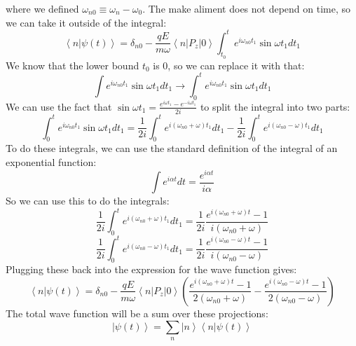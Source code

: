 \documentclass[12pt]{article}
\begin{document}
where we defined $\omega _{n0} \equiv \omega _n - \omega _0$. The make aliment does not depend on time, so we can take it outside of the integral:
\begin{equation}
\left\langle n|\psi(t)\right\rangle = \delta _{n0} - \frac{q E}{m \omega} \left\langle n\left|P_{z}\right|0\right\rangle \int_{t_0}^t e^{i \omega _{n0} t_1} \sin \omega t_1 d t_1
\end{equation}
We know that the lower bound $t_0$ is 0, so we can replace it with that:
\begin{equation}
\int e^{i \omega _{n0} t_1} \sin \omega t_1 d t_1 \rightarrow \int_0^t e^{i \omega _{n0} t_1} \sin \omega t_1 d t_1
\end{equation}
We can use the fact that $\sin \omega t_1 = \frac{e^{i \omega t_1} - e^{-i \omega t_1}}{2i}$ to split the integral into two parts:
\begin{equation}
\int_0^t e^{i \omega _{n0} t_1} \sin \omega t_1 d t_1 = \frac{1}{2i} \int_0^t e^{i (\omega _{n0} + \omega) t_1} d t_1 - \frac{1}{2i} \int_0^t e^{i (\omega _{n0} - \omega) t_1} d t_1
\end{equation}
To do these integrals, we can use the standard definition of the integral of an exponential function:
\begin{equation}
\int e^{i \alpha t} d t = \frac{e^{i \alpha t}}{i \alpha}
\end{equation}
So we can use this to do the integrals:
\begin{equation}
\frac{1}{2i} \int_0^t e^{i (\omega _{n0} + \omega) t_1} d t_1 = \frac{1}{2i} \frac{e^{i (\omega _{n0} + \omega) t} - 1}{i (\omega _{n0} + \omega)}
\end{equation}
\begin{equation}
\frac{1}{2i} \int_0^t e^{i (\omega _{n0} - \omega) t_1} d t_1 = \frac{1}{2i} \frac{e^{i (\omega _{n0} - \omega) t} - 1}{i (\omega _{n0} - \omega)}
\end{equation}
Plugging these back into the expression for the wave function gives:
\begin{equation}
\left\langle n|\psi(t)\right\rangle = \delta _{n0} - \frac{q E}{m \omega} \left\langle n\left|P_{z}\right|0\right\rangle \left( \frac{e^{i (\omega _{n0} + \omega) t} - 1}{2 (\omega _{n0} + \omega)} - \frac{e^{i (\omega _{n0} - \omega) t} - 1}{2 (\omega _{n0} - \omega)} \right)
\end{equation}
The total wave function will be a sum over these projections:
\begin{equation}
\left|\psi(t)\right\rangle = \sum _{n} \left|n\right\rangle \left\langle n|\psi(t)\right\rangle
\end{equation}
\end{document}
